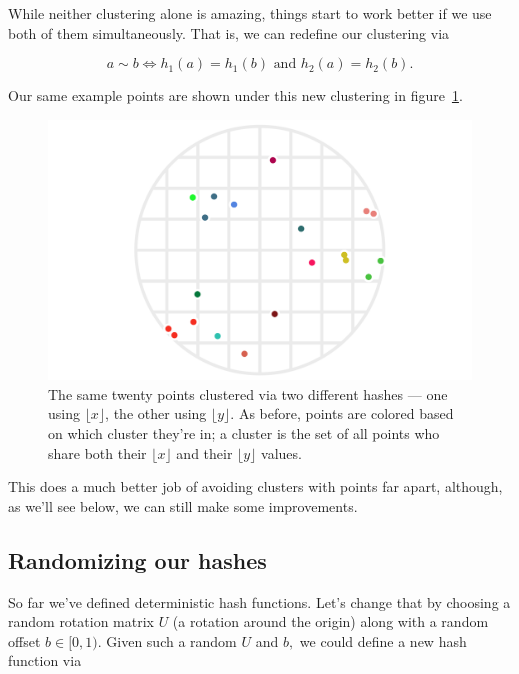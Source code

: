 \documentclass[20pt,]{extarticle}
\begin{document}
While neither clustering alone is amazing, things start to work better
if we use both of them simultaneously. That is, we can redefine our
clustering via

\begin{equation} a \sim b \iff h_1(a) = h_1(b) \text{ and } h_2(a) = h_2(b). \label{eq:eq1}\end{equation}

Our same example points are shown under this new clustering in
figure~\ref{fig:fig3}.

\begin{figure}
\centering
\includegraphics{images/lsh_image3.png}
\caption{The same twenty points clustered via two different hashes ---
one using \(\lfloor x\rfloor\), the other using \(\lfloor y\rfloor.\) As
before, points are colored based on which cluster they're in; a cluster
is the set of all points who share both their \(\lfloor x\rfloor\) and
their \(\lfloor y\rfloor\) values.}\label{fig:fig3}
\end{figure}

This does a much better job of avoiding clusters with points far apart,
although, as we'll see below, we can still make some improvements.

\subsection{Randomizing our hashes}\label{randomizing-our-hashes}

So far we've defined deterministic hash functions. Let's change that by
choosing a random rotation matrix \(U\) (a rotation around the origin)
along with a random offset \(b \in [0, 1).\) Given such a random \(U\)
and \(b,\) we could define a new hash function via
\end{document}
